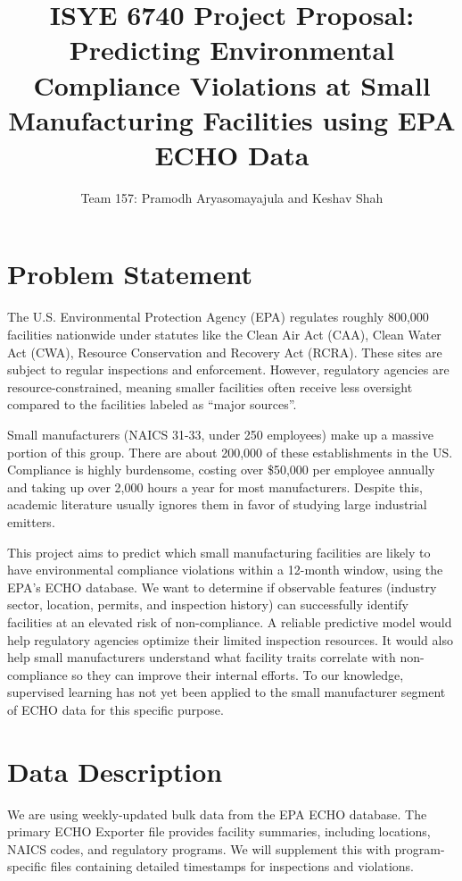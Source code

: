\documentclass{article}
\title{ISYE 6740 Project Proposal: \\ Predicting Environmental Compliance Violations at Small Manufacturing Facilities using EPA ECHO Data}
\author{Team 157: Pramodh Aryasomayajula and Keshav Shah}
\date{}
\begin{document}
\maketitle

\section{Problem Statement}

The U.S. Environmental Protection Agency (EPA) regulates roughly 800,000 facilities nationwide under statutes like the Clean Air Act (CAA), Clean Water Act (CWA), Resource Conservation and Recovery Act
(RCRA). These sites are subject to regular inspections and enforcement. However, regulatory agencies are resource-constrained, meaning smaller facilities often receive less oversight compared to the facilities labeled as ``major sources''.

Small manufacturers (NAICS 31-33, under 250 employees) make up a massive portion of this group. There are about 200,000 of these establishments in the US. Compliance is highly burdensome, costing over \$50,000 per employee annually and taking up over 2,000 hours a year for most manufacturers. Despite this, academic literature usually ignores them in favor of studying large industrial emitters.

This project aims to predict which small manufacturing facilities are likely to have environmental compliance violations within a 12-month window, using the EPA's ECHO database. We want to determine if observable features (industry sector, location, permits, and inspection history) can successfully identify facilities at an elevated risk of non-compliance. A reliable predictive model would help regulatory agencies optimize their limited inspection resources. It would also help small manufacturers understand what facility traits correlate with non-compliance so they can improve their internal efforts. To our knowledge, supervised learning has not yet been applied to the small manufacturer segment of ECHO data for this specific purpose.

\section{Data Description}

We are using weekly-updated bulk data from the EPA ECHO database. The primary ECHO Exporter file provides facility summaries, including locations, NAICS codes, and regulatory programs. We will supplement this with program-specific files containing detailed timestamps for inspections and violations.
\end{document}
